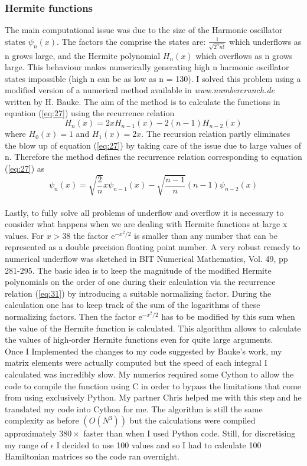 \documentclass[10pt, a4paper, singlespacing, headsepline]{report}
\begin{document}
\subsubsection{Hermite functions}\label{Hermite}
The main computational issue was due to the size of the Harmonic oscillator states $\psi_n(x)$. The factors the comprise the states are: $\frac{1}{\sqrt{2^n n!}}$ which underflows as n grows large, and the Hermite polynomial $H_n(x)$ which overflows as n grows large. This behaviour makes numerically generating high n harmonic oscillator states impossible (high n can be as low as n = 130).
I solved this problem using a modified version of a numerical method available in \emph{www.numbercrunch.de} written by H. Bauke. The aim of the method is to calculate the functions in equation (\ref{eq:27}) using the recurrence relation 
\begin{equation} \label{eq:30}
H_n(x) = 2xH_{n-1}(x) - 2(n-1)H_{n-2}(x)
\end{equation}
where $H_0(x) = 1 $ and $H_1(x) = 2x$. The recursion relation partly eliminates the blow up of equation (\ref{eq:27}) by taking care of the issue due to large values of n. Therefore the method defines the recurrence relation corresponding to equation (\ref{eq:27}) as 
\begin{equation} \label{eq:31}
\psi_n(x) = \sqrt{\frac{2}{n}}x\psi_{n-1}(x) - \sqrt{\frac{n-1}{n}}(n-1)\psi_{n-2}(x)
\end{equation}
\\Lastly, to fully solve all problems of underflow and overflow it is necessary to consider what happens when we are dealing with Hermite functions at large x values.
For $x>38$ the factor $\mathrm{e}^{-x^2/2}$ is smaller than any number that can be represented as a double precision floating point number. A very robust remedy to numerical underflow was sketched in BIT Numerical Mathematics, Vol. 49, pp 281-295. The basic idea is to keep the magnitude of the modified Hermite polynomials on the order of one during their calculation via the recurrence relation (\ref{eq:31}) by introducing a suitable normalizing factor. During the calculation one has to keep track of the sum of the logarithms of these normalizing factors. Then the factor $\mathrm{e}^{-x^2/2}$ has to be modified by this sum when the value of the Hermite function is calculated. This algorithm allows to calculate the values of high-order Hermite functions even for quite large arguments\cite{Bauke}.\\

Once I Implemented the changes to my code suggested by Bauke's work, my matrix elements were actually computed but the speed of each integral I calculated was incredibly slow. My numerics required some Cython to allow the code to compile the function using C in order to bypass the limitations that come from using exclusively Python. My partner Chris helped me with this step and he translated my code into Cython for me. The algorithm is still the same complexity as before $(O(N^3))$ but the calculations were compiled approximately $380\times$ faster than when I used Python code. Still, for discretising my range of $\epsilon$ I decided to use 100 values and so I had to calculate 100 Hamiltonian matrices so the code ran overnight.
\end{document}
